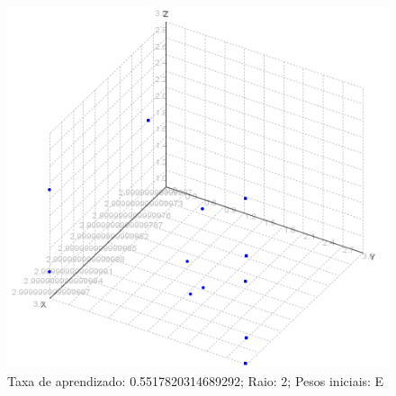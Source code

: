 \newpage
\begin{figure}[ht!]
	\centering
	\includegraphics[scale=0.4]{./imgs/2e2.png}
	\caption{Taxa de aprendizado: 0.5517820314689292; Raio: 2; Pesos iniciais: E}
\end{figure}

